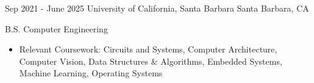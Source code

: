 \documentclass[9pt]{developercv} %
\begin{document}
\vspace{-6 pt}
\vspace{-4 pt}
\begin{entrylist}
    \entry
		{Sep 2021 - June 2025}
		{University of California, Santa Barbara}
		{Santa Barbara, CA}
		{B.S. Computer Engineering
        \vspace{1pt}
        \begin{itemize}[noitemsep,topsep=0pt,parsep=0pt,partopsep=0pt, leftmargin=10pt]
            \item Relevant Coursework: Circuits and Systems, Computer Architecture, Computer Vision, Data Structures \& Algorithms, Embedded Systems, Machine Learning, Operating Systems
        \end{itemize}}
\end{entrylist}
\end{document}
